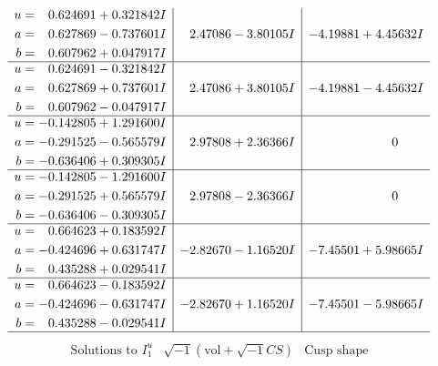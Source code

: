 \documentclass[1p]{elsarticle_modified}
\theoremstyle{definition}
\newcommand{\I}{\sqrt{-1}}
\begin{document}
$$\begin{array}{c|c|c}
\begin{aligned}
u &= \phantom{-}0.624691 + 0.321842 I \\
a &= \phantom{-}0.627869 - 0.737601 I \\
b &= \phantom{-}0.607962 + 0.047917 I\end{aligned}
 & \phantom{-}2.47086 - 3.80105 I & -4.19881 + 4.45632 I \\ \hline\begin{aligned}
u &= \phantom{-}0.624691 - 0.321842 I \\
a &= \phantom{-}0.627869 + 0.737601 I \\
b &= \phantom{-}0.607962 - 0.047917 I\end{aligned}
 & \phantom{-}2.47086 + 3.80105 I & -4.19881 - 4.45632 I \\ \hline\begin{aligned}
u &= -0.142805 + 1.291600 I \\
a &= -0.291525 - 0.565579 I \\
b &= -0.636406 + 0.309305 I\end{aligned}
 & \phantom{-}2.97808 + 2.36366 I & \phantom{-0.000000 } 0 \\ \hline\begin{aligned}
u &= -0.142805 - 1.291600 I \\
a &= -0.291525 + 0.565579 I \\
b &= -0.636406 - 0.309305 I\end{aligned}
 & \phantom{-}2.97808 - 2.36366 I & \phantom{-0.000000 } 0 \\ \hline\begin{aligned}
u &= \phantom{-}0.664623 + 0.183592 I \\
a &= -0.424696 + 0.631747 I \\
b &= \phantom{-}0.435288 + 0.029541 I\end{aligned}
 & -2.82670 - 1.16520 I & -7.45501 + 5.98665 I \\ \hline\begin{aligned}
u &= \phantom{-}0.664623 - 0.183592 I \\
a &= -0.424696 - 0.631747 I \\
b &= \phantom{-}0.435288 - 0.029541 I\end{aligned}
 & -2.82670 + 1.16520 I & -7.45501 - 5.98665 I\\
 \hline 
 \end{array}$$\newpage$$\begin{array}{c|c|c}  
\text{Solutions to }I^u_{1}& \I (\text{vol} + \sqrt{-1}CS) & \text{Cusp shape}\\
 \hline 
\begin{aligned}

\end{aligned}
\end{array}$$
\end{document}
